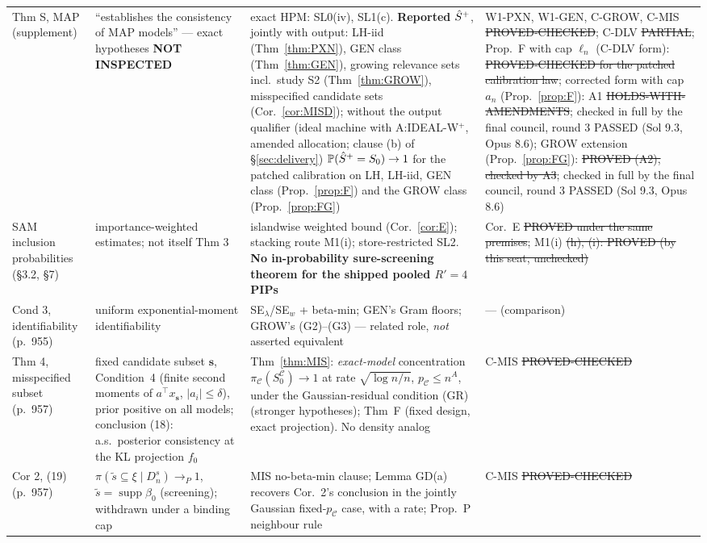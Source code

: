 {\begin{xltabular}{\linewidth}{@{}p{2.4cm}p{3.5cm}Xp{3.4cm}@{}}
Thm S, MAP (supplement) & ``establishes the consistency of MAP models'' — exact hypotheses \textbf{NOT INSPECTED} & exact HPM: SL0(iv), SL1(c). \textbf{Reported} $\hat S^{+}$, jointly with output: LH-iid (Thm~\ref{thm:PXN}), GEN class (Thm~\ref{thm:GEN}), growing relevance sets incl.\ study S2 (Thm~\ref{thm:GROW}), misspecified candidate sets (Cor.~\ref{cor:MISD}); without the output qualifier (ideal machine with A:IDEAL-W$^{+}$, amended allocation; clause (b) of §\ref{sec:delivery}) $\mathbb P(\hat S^{+}=S_0)\to1$ for the patched calibration on LH, LH-iid, GEN class (Prop.~\ref{prop:F}) and the GROW class (Prop.~\ref{prop:FG}) & W1-PXN, W1-GEN, C-GROW, C-MIS \st{PROVED-CHECKED}; C-DLV \st{PARTIAL}; Prop.~F with cap $\ell_n$ (C-DLV form): \st{PROVED-CHECKED for the patched calibration law}; corrected form with cap $a_n$ (Prop.~\ref{prop:F}): A1 \st{HOLDS-WITH-AMENDMENTS}; checked in full by the final council, round 3 PASSED (Sol 9.3, Opus 8.6); GROW extension (Prop.~\ref{prop:FG}): \st{PROVED (A2), checked by A3}; checked in full by the final council, round 3 PASSED (Sol 9.3, Opus 8.6) \\
SAM inclusion probabilities (§3.2, §7) & importance-weighted estimates; not itself Thm 3 & islandwise weighted bound (Cor.~\ref{cor:E}); stacking route M1(i); store-restricted SL2. \textbf{No in-probability sure-screening theorem for the shipped pooled $R'=4$ PIPs} & Cor.~E \st{PROVED under the same premises}; M1(i) \st{(h), (i): PROVED (by this seat, unchecked)} \\
Cond 3, identifiability (p.~955) & uniform exponential-moment identifiability & SE$_\lambda$/SE$_w$ + beta-min; GEN's Gram floors; GROW's (G2)–(G3) — related role, \emph{not} asserted equivalent & — (comparison) \\
Thm 4, misspecified subset (p.~957) & fixed candidate subset $\mathbf s$, Condition~4 (finite second moments of $a^\top x_{\mathbf s}$, $|a_i|\le\delta$), prior positive on all models; conclusion (18): a.s.\ posterior consistency at the KL projection $f_0$ & Thm~\ref{thm:MIS}: \emph{exact-model} concentration $\pi_{\mathcal C}(S_0^{\mathcal C})\to1$ at rate $\sqrt{\log n/n}$, $p_{\mathcal C}\le n^A$, under the Gaussian-residual condition (GR) (stronger hypotheses); Thm~F (fixed design, exact projection). No density analog & C-MIS \st{PROVED-CHECKED} \\
Cor 2, (19) (p.~957) & $\pi(\tilde{s}\subseteq\xi\mid D_n^s)\to_P1$, $\tilde{s}=\operatorname{supp}\beta_0$ (screening); withdrawn under a binding cap & MIS no-beta-min clause; Lemma GD(a) recovers Cor.~2's conclusion in the jointly Gaussian fixed-$p_{\mathcal C}$ case, with a rate; Prop.~P neighbour rule & C-MIS \st{PROVED-CHECKED} \\

\end{xltabular}}
